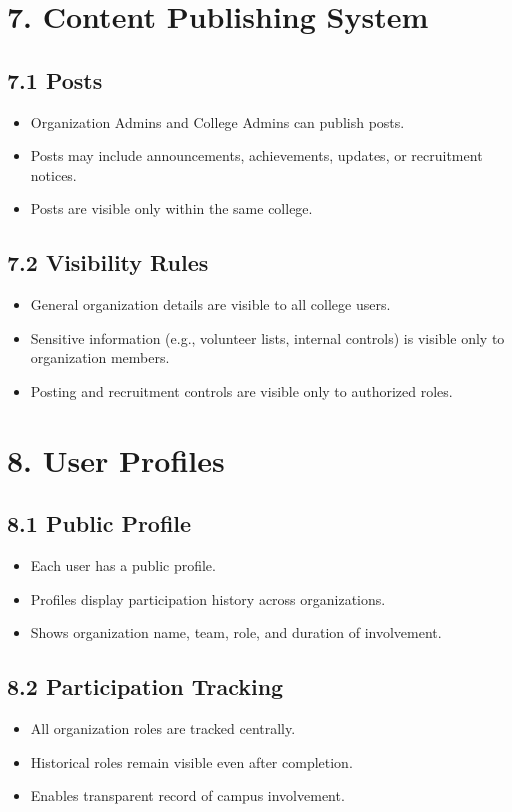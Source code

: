 \documentclass[12pt]{article}
\begin{document}
\section*{7. Content Publishing System}

\subsection*{7.1 Posts}
\begin{itemize}
    \item Organization Admins and College Admins can publish posts.
    \item Posts may include announcements, achievements, updates, or recruitment notices.
    \item Posts are visible only within the same college.
\end{itemize}

\subsection*{7.2 Visibility Rules}
\begin{itemize}
    \item General organization details are visible to all college users.
    \item Sensitive information (e.g., volunteer lists, internal controls) is visible only to organization members.
    \item Posting and recruitment controls are visible only to authorized roles.
\end{itemize}

\section*{8. User Profiles}

\subsection*{8.1 Public Profile}
\begin{itemize}
    \item Each user has a public profile.
    \item Profiles display participation history across organizations.
    \item Shows organization name, team, role, and duration of involvement.
\end{itemize}

\subsection*{8.2 Participation Tracking}
\begin{itemize}
    \item All organization roles are tracked centrally.
    \item Historical roles remain visible even after completion.
    \item Enables transparent record of campus involvement.
\end{itemize}
\end{document}
